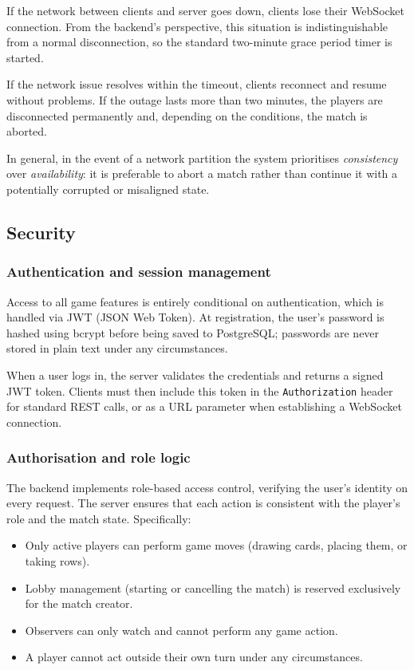 \documentclass{scrartcl}
\begin{document}
If the network between clients and server goes down, clients lose their
WebSocket connection.
From the backend's perspective, this situation is indistinguishable from
a normal disconnection, so the standard two-minute grace period timer is started.

If the network issue resolves within the timeout, clients reconnect
and resume without problems.
If the outage lasts more than two minutes, the players are disconnected
permanently and, depending on the conditions, the match is aborted.

In general, in the event of a network partition the system prioritises
\emph{consistency} over \emph{availability}: it is preferable to abort a match
rather than continue it with a potentially corrupted or misaligned state.

\subsection{Security}\label{security}

\subsubsection*{Authentication and session management}

Access to all game features is entirely conditional on authentication,
which is handled via JWT (JSON Web Token).
At registration, the user's password is hashed using bcrypt before being
saved to PostgreSQL; passwords are never stored in plain text under any circumstances.

When a user logs in, the server validates the credentials and returns a signed
JWT token.
Clients must then include this token in the \texttt{Authorization} header
for standard REST calls, or as a URL parameter when establishing
a WebSocket connection.

\subsubsection*{Authorisation and role logic}

The backend implements role-based access control, verifying the user's identity
on every request.
The server ensures that each action is consistent with the player's role
and the match state. Specifically:

\begin{itemize}
  \item Only active players can perform game moves
  (drawing cards, placing them, or taking rows).
  \item Lobby management (starting or cancelling the match) is reserved
  exclusively for the match creator.
  \item Observers can only watch and cannot perform any game action.
  \item A player cannot act outside their own turn under any circumstances.
\end{itemize}
\end{document}
